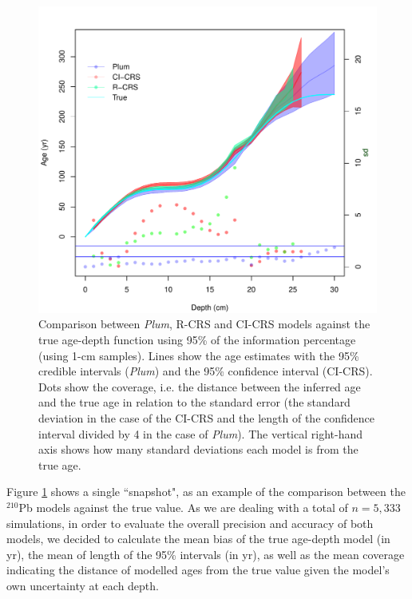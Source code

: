 \documentclass [10pt] {article}
\begin{document}
\begin{figure}[!]
	\centering
	\includegraphics[width=\linewidth]{95Comparison.pdf}
		\caption{Comparison between \textit{Plum}, R-CRS and CI-CRS models against the true age-depth function using 95\% of the information percentage (using 1-cm samples). Lines show the age estimates with the 95\% credible intervals (\textit{Plum}) and the 95\% confidence interval (CI-CRS). Dots show the coverage, i.e. the distance between the inferred age and the true age in relation to the standard error (the standard deviation in the case of the CI-CRS and the length of the confidence interval divided by 4 in the case of \textit{Plum}). The vertical right-hand axis shows how many standard deviations each model is from the true age.  }
		\label{fig:comparison1r}
\end{figure}

Figure \ref{fig:comparison1r} shows a single ``snapshot", as an example of the comparison between the $^{210}$Pb models against the true value. 
As we are dealing with a total of $n = 5,333$ simulations, in order to evaluate the overall precision and accuracy of both models, we decided to calculate the mean bias of the true age-depth model (in yr), the mean of length of the 95\% intervals (in yr), as well as the mean coverage indicating the distance of modelled ages from the true value given the model's own uncertainty at each depth.  
\end{document}
